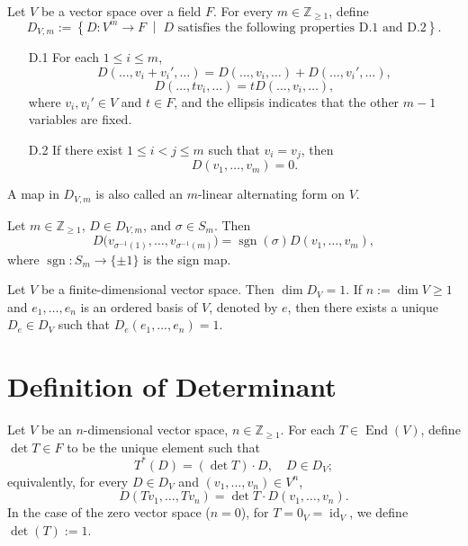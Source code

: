 \begin{definition}
Let $V$ be a vector space over a field $F$. For every $m \in \mathbb{Z}_{\geq 1}$, define
\[
D_{V,m} := \left\{ D : V^m \to F \;\middle|\; \text{$D$ satisfies the following properties D.1 and D.2} \right\}.
\]
\begin{itemize}
    \item[D.1] For each $1 \leq i \leq m$,
    \[
    D(\ldots, v_i + v_i', \ldots) = D(\ldots, v_i, \ldots) + D(\ldots, v_i', \ldots),
    \]
    \[
    D(\ldots, t v_i, \ldots) = t D(\ldots, v_i, \ldots),
    \]
    where $v_i, v_i' \in V$ and $t \in F$, and the ellipsis indicates that the other $m-1$ variables are fixed.
    \item[D.2] If there exist $1 \leq i < j \leq m$ such that $v_i = v_j$, then
    \[
    D(v_1, \ldots, v_m) = 0.
    \]
\end{itemize}
A map in $D_{V,m}$ is also called an $m$-linear alternating form on $V$.
\end{definition}

\begin{lemma}
Let $m \in \mathbb{Z}_{\geq 1}$, $D \in D_{V,m}$, and $\sigma \in S_m$. Then
\[
D\big(v_{\sigma^{-1}(1)}, \ldots, v_{\sigma^{-1}(m)}\big) = \operatorname{sgn}(\sigma) D(v_1, \ldots, v_m),
\]
where $\operatorname{sgn} : S_m \to \{\pm 1\}$ is the sign map.
\end{lemma}

\begin{theorem}
Let $V$ be a finite-dimensional vector space. Then $\dim D_V = 1$. If $n := \dim V \geq 1$ and $e_1, \ldots, e_n$ is an ordered basis of $V$, denoted by $e$, then there exists a unique $D_e \in D_V$ such that $D_e(e_1, \ldots, e_n) = 1$.
\end{theorem}

\section{Definition of Determinant}

\begin{definition}
Let $V$ be an $n$-dimensional vector space, $n \in \mathbb{Z}_{\geq 1}$. For each $T \in \operatorname{End}(V)$, define $\det T \in F$ to be the unique element such that
\[
T^*(D) = (\det T) \cdot D, \quad D \in D_V;
\]
equivalently, for every $D \in D_V$ and $(v_1, \ldots, v_n) \in V^n$,
\[
D(T v_1, \ldots, T v_n) = \det T \cdot D(v_1, \ldots, v_n).
\]
In the case of the zero vector space ($n = 0$), for $T = 0_V = \operatorname{id}_V$, we define $\det(T) := 1$.
\end{definition}

